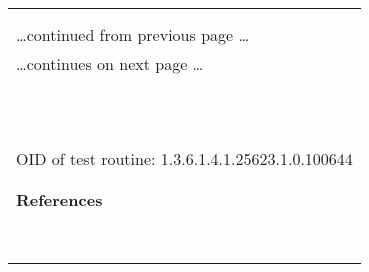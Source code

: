 \documentclass{article}
\begin{document}
\begin{longtable}{|p{}|}
\hline
\rowcolor{openvas_warning}{\color{white}{Medium (CVSS: 5.0) }}\\
\rowcolor{openvas_warning}{\color{white}{NVT: Samba Multiple Remote Denial of Service Vulnerabilities}}\\
\hline
\endfirsthead
\hfill\ldots continued from previous page \ldots \\
\hline
\endhead
\hline
\ldots continues on next page \ldots \\
\endfoot
\hline
\endlastfoot
\\
\rowcolor{white}{\verb= Summary:=}\\
\rowcolor{white}{\verb= Samba is prone to multiple remote denial-of-service vulnerabilities.=}\\
\rowcolor{white}{\verb=An attacker can exploit these issues to crash the application, denying=}\\
\rowcolor{white}{\verb=service to legitimate users.=}\\
\rowcolor{white}{\verb=Versions prior to Samba 3.4.8 and 3.5.2 are vulnerable.=}\\
\rowcolor{white}{\verb= Solution:=}\\
\rowcolor{white}{\verb= Updates are available. Please see the references for more information.=}\\
\rowcolor{white}{\verb==}\\
\rowcolor{white}{\verb==}\\
\\
OID of test routine: 1.3.6.1.4.1.25623.1.0.100644\\
\\

      \hline
      \\
\textbf{References}\\
\rowcolor{white}{\verb=CVE: CVE-2010-1635=}\\
\rowcolor{white}{\verb=BID:40097=}\\
\rowcolor{white}{\verb=Other:=}\\
\rowcolor{white}{\verb=  URL:http://www.securityfocus.com/bid/40097=}\\
\rowcolor{white}{\verb=   URL:https://bugzilla.samba.org/show_bug.cgi?id=\verb-=-\verb=7254=}\\
\rowcolor{white}{\verb=   URL:http://samba.org/samba/history/samba-3.4.8.html=}\\
\rowcolor{white}{\verb=   URL:http://samba.org/samba/history/samba-3.5.2.html=}\\
\rowcolor{white}{\verb=   URL:http://www.samba.org=}\\
\end{longtable}
\end{document}
